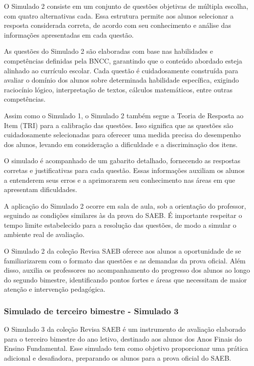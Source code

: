 O Simulado 2 consiste em um conjunto de questões objetivas de múltipla
escolha, com quatro alternativas cada. Essa estrutura permite aos alunos
selecionar a resposta considerada correta, de acordo com seu
conhecimento e análise das informações apresentadas em cada questão.

As questões do Simulado 2 são elaboradas com base nas habilidades e
competências definidas pela BNCC, garantindo que o conteúdo abordado
esteja alinhado ao currículo escolar. Cada questão é cuidadosamente
construída para avaliar o domínio dos alunos sobre determinada
habilidade específica, exigindo raciocínio lógico, interpretação de
textos, cálculos matemáticos, entre outras competências.

Assim como o Simulado 1, o Simulado 2 também segue a Teoria de Resposta
ao Item (TRI) para a calibração das questões. Isso significa que as
questões são cuidadosamente selecionadas para oferecer uma medida
precisa do desempenho dos alunos, levando em consideração a dificuldade
e a discriminação dos itens.

O simulado é acompanhado de um gabarito detalhado, fornecendo as
respostas corretas e justificativas para cada questão. Essas informações
auxiliam os alunos a entenderem seus erros e a aprimorarem seu
conhecimento nas áreas em que apresentam dificuldades.

A aplicação do Simulado 2 ocorre em sala de aula, sob a orientação do
professor, seguindo as condições similares às da prova do SAEB. É
importante respeitar o tempo limite estabelecido para a resolução das
questões, de modo a simular o ambiente real de avaliação.

O Simulado 2 da coleção Revisa SAEB oferece aos alunos a oportunidade de se
familiarizarem com o formato das questões e as demandas da prova
oficial. Além disso, auxilia os professores no acompanhamento do
progresso dos alunos ao longo do segundo bimestre, identificando pontos
fortes e áreas que necessitam de maior atenção e intervenção pedagógica.

\subsubsection{Simulado de terceiro bimestre - Simulado
3}\label{simulado-de-terceiro-bimestre---simulado-3}

O Simulado 3 da coleção Revisa SAEB é um instrumento de avaliação elaborado para o
terceiro bimestre do ano letivo, destinado aos alunos dos Anos Finais
do Ensino Fundamental. Esse simulado tem como objetivo proporcionar uma
prática adicional e desafiadora, preparando os alunos para a prova
oficial do SAEB.

